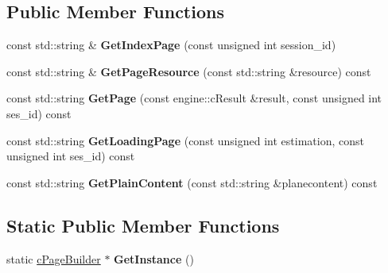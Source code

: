 \subsection*{\-Public \-Member \-Functions}
\begin{DoxyCompactItemize}
\item 
\hypertarget{classhttp__server_1_1cPageBuilder_aad87a17faa8505727c8faac59a7a9674}{const std\-::string \& {\bfseries \-Get\-Index\-Page} (const unsigned int session\-\_\-id)}\label{classhttp__server_1_1cPageBuilder_aad87a17faa8505727c8faac59a7a9674}

\item 
\hypertarget{classhttp__server_1_1cPageBuilder_ac7a52ef639767e3f9297376cced2a8ab}{const std\-::string \& {\bfseries \-Get\-Page\-Resource} (const std\-::string \&resource) const }\label{classhttp__server_1_1cPageBuilder_ac7a52ef639767e3f9297376cced2a8ab}

\item 
\hypertarget{classhttp__server_1_1cPageBuilder_a399e3fcab5b631e64907a183af1e8b44}{const std\-::string {\bfseries \-Get\-Page} (const engine\-::c\-Result \&result, const unsigned int ses\-\_\-id) const }\label{classhttp__server_1_1cPageBuilder_a399e3fcab5b631e64907a183af1e8b44}

\item 
\hypertarget{classhttp__server_1_1cPageBuilder_a903fe3604f402c70bd04aefbbe322cbc}{const std\-::string {\bfseries \-Get\-Loading\-Page} (const unsigned int estimation, const unsigned int ses\-\_\-id) const }\label{classhttp__server_1_1cPageBuilder_a903fe3604f402c70bd04aefbbe322cbc}

\item 
\hypertarget{classhttp__server_1_1cPageBuilder_a1d94480e16491f15aa3ed974dfb181e1}{const std\-::string {\bfseries \-Get\-Plain\-Content} (const std\-::string \&planecontent) const }\label{classhttp__server_1_1cPageBuilder_a1d94480e16491f15aa3ed974dfb181e1}

\end{DoxyCompactItemize}
\subsection*{\-Static \-Public \-Member \-Functions}
\begin{DoxyCompactItemize}
\item 
\hypertarget{classhttp__server_1_1cPageBuilder_acf7940105f1b4f5d77a0cecac9a69db6}{static \hyperlink{classhttp__server_1_1cPageBuilder}{c\-Page\-Builder} $\ast$ {\bfseries \-Get\-Instance} ()}\label{classhttp__server_1_1cPageBuilder_acf7940105f1b4f5d77a0cecac9a69db6}

\end{DoxyCompactItemize}
